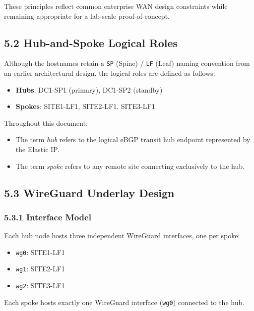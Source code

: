 \documentclass[11pt]{article}
\begin{document}
These principles reflect common enterprise WAN design constraints while remaining appropriate for a lab-scale proof-of-concept.

\subsection{5.2 Hub-and-Spoke Logical Roles}
\label{sec:logical-roles}

Although the hostnames retain a \texttt{SP} (Spine) / \texttt{LF} (Leaf) naming convention from an earlier architectural design, the logical roles are defined as follows:

\begin{itemize}
  \item \textbf{Hubs}: DC1-SP1 (primary), DC1-SP2 (standby)
  \item \textbf{Spokes}: SITE1-LF1, SITE2-LF1, SITE3-LF1
\end{itemize}

Throughout this document:

\begin{itemize}
  \item The term \textit{hub} refers to the logical eBGP transit hub endpoint represented by the Elastic IP.
  \item The term \textit{spoke} refers to any remote site connecting exclusively to the hub.
\end{itemize}

\subsection{5.3 WireGuard Underlay Design}
\label{sec:wg-underlay-design}

\subsubsection{5.3.1 Interface Model}
\label{sec:wg-interface-model}

Each hub node hosts three independent WireGuard interfaces, one per spoke:

\begin{itemize}
  \item \texttt{wg0}: SITE1-LF1
  \item \texttt{wg1}: SITE2-LF1
  \item \texttt{wg2}: SITE3-LF1
\end{itemize}

Each spoke hosts exactly one WireGuard interface (\texttt{wg0}) connected to the hub.
\end{document}
